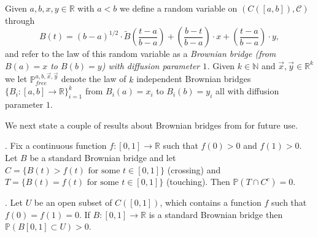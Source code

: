 Given $a, b,x,y \in \mathbb{R}$ with $a < b$ we define a random variable on $(C([a,b]), \mathcal{C})$ through
\begin{equation}\label{BBDef}
B(t) = (b-a)^{1/2} \cdot \tilde{B} \left( \frac{t - a}{b-a} \right) + \left(\frac{b-t}{b-a} \right) \cdot x + \left( \frac{t- a}{b-a}\right) \cdot y, 
\end{equation}
and refer to the law of this random variable as a {\em Brownian bridge (from $B(a) = x$ to $B(b) = y$) with diffusion parameter $1$.} Given $k \in \mathbb{N}$ and $\vec{x}, \vec{y} \in \mathbb{R}^k$ we let $\mathbb{P}^{a,b, \vec{x},\vec{y}}_{free}$ denote the law of $k$ independent Brownian bridges $\{B_i: [a,b] \rightarrow \mathbb{R} \}_{i = 1}^k$ from $B_i(a) = x_i$ to $B_i(b) = y_i$ all with diffusion parameter $1$.

We next state a couple of results about Brownian bridges from \cite{CorHamA} for future use.
\begin{lemma}\label{NoTouch} \cite[Corollary 2.9]{CorHamA}. Fix a continuous function $f: [0,1] \rightarrow \mathbb{R}$ such that $f(0) > 0$ and $f(1) > 0$. Let $B$ be a standard Brownian bridge and let $C = \{ B(t) > f(t) \mbox{ for some $t \in [0,1]$}\}$ (crossing) and $T = \{ B(t) = f(t) \mbox{ for some } t\in [0,1]\}$ (touching). Then $\mathbb{P}(T \cap C^c) = 0.$
\end{lemma}
\begin{lemma}\label{Spread} \cite[Corollary 2.10]{CorHamA}. Let $U$ be an open subset of $C([0,1])$, which contains a function $f$ such that $f(0) = f(1) = 0$. If $B:[0,1] \rightarrow \mathbb{R}$ is a standard Brownian bridge then $\mathbb{P}(B[0,1] \subset U) > 0$.
\end{lemma}

